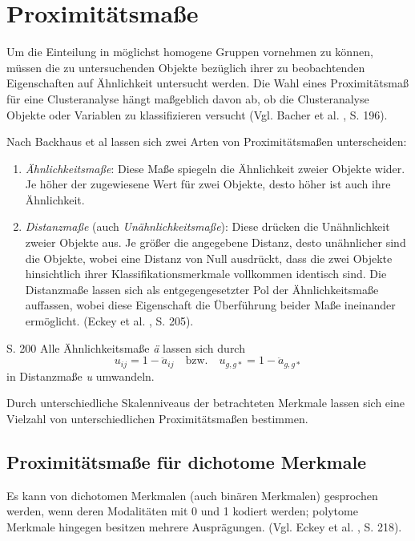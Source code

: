 \chapter{Proximitätsmaße}

Um die Einteilung in möglichst homogene Gruppen vornehmen zu können, müssen die zu untersuchenden Objekte bezüglich ihrer zu beobachtenden Eigenschaften auf Ähnlichkeit untersucht werden. Die Wahl eines Proximitätsmaß für eine Clusteranalyse hängt maßgeblich davon ab, ob die Clusteranalyse Objekte oder Variablen zu klassifizieren versucht (Vgl. Bacher et al. \cite{Bacher.2010}, S. 196).

Nach Backhaus et al \cite{Backhaus.2016} lassen sich zwei Arten von Proximitätsmaßen unterscheiden:

\begin{enumerate}
	\item \textit{Ähnlichkeitsmaße}: Diese Maße spiegeln die Ähnlichkeit zweier Objekte wider. Je höher der zugewiesene Wert für zwei Objekte, desto höher ist auch ihre Ähnlichkeit.
	\item \textit{Distanzmaße} (auch \textit{Unähnlichkeitsmaße}): Diese drücken die Unähnlichkeit zweier Objekte aus. Je größer die angegebene Distanz, desto unähnlicher sind die Objekte, wobei eine Distanz von Null ausdrückt, dass die zwei Objekte hinsichtlich ihrer Klassifikationsmerkmale vollkommen identisch sind. Die Distanzmaße lassen sich als entgegengesetzter Pol der Ähnlichkeitsmaße auffassen, wobei diese Eigenschaft die Überführung beider Maße ineinander ermöglicht. (Eckey et al. \cite{Eckey.2002}, S. 205).
\end{enumerate}

\cite{Bacher.2010} S. 200 Alle Ähnlichkeitsmaße \textit{ä} lassen sich durch 
\begin{equation}
u_{ij} = 1 - \ddot{a}_{ij} \quad \text{bzw.} \quad u_{g,g*} = 1- \ddot{a}_{g,g*}
\end{equation}
in Distanzmaße \textit{u} umwandeln.

Durch unterschiedliche Skalenniveaus der betrachteten Merkmale lassen sich eine Vielzahl von unterschiedlichen Proximitätsmaßen bestimmen.

\section{Proximitätsmaße für dichotome Merkmale}
Es kann von dichotomen Merkmalen (auch binären Merkmalen) gesprochen werden, wenn deren Modalitäten mit 0 und 1 kodiert werden; polytome Merkmale hingegen besitzen mehrere Ausprägungen. (Vgl. Eckey et al. \cite{Eckey.2002}, S. 218). 

